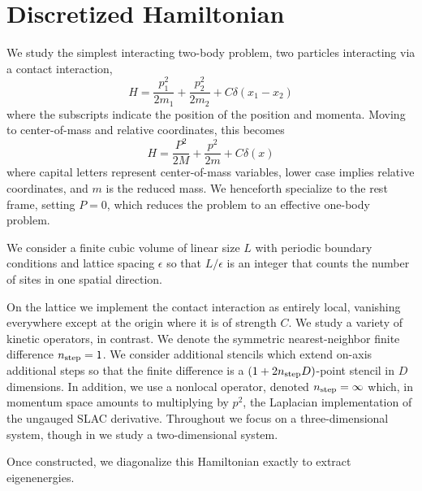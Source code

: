\section{Discretized Hamiltonian}\label{sec:hamiltonian}

We study the simplest interacting two-body problem, two particles interacting via a contact interaction,
\begin{equation}
    H = \frac{p_1^2}{2 m_1} + \frac{p_2^2}{2 m_2} + C \delta(x_1-x_2)
\end{equation}
where the subscripts indicate the position of the position and momenta.  Moving to center-of-mass and relative coordinates, this becomes
\begin{equation}
    H = \frac{P^2}{2 M} + \frac{p^2}{2 m} + C \delta(x)
\end{equation}
where capital letters represent center-of-mass variables, lower case implies relative coordinates, and $m$ is the reduced mass.  We henceforth specialize to the rest frame, setting $P=0$, which reduces the problem to an effective one-body problem.

We consider a finite cubic volume of linear size $L$ with periodic boundary conditions and lattice spacing $\epsilon$ so that $L/\epsilon$ is an integer that counts the number of sites in one spatial direction.

On the lattice we implement the contact interaction as entirely local, vanishing everywhere except at the origin where it is of strength $C$.  We study a variety of kinetic operators, in contrast.  We denote the symmetric nearest-neighbor finite difference $n_\text{step}=1$.  We consider additional stencils which extend on-axis additional steps so that the finite difference is a $(1+2n_\text{step} D)$-point stencil in $D$ dimensions.  In addition, we use a nonlocal operator, denoted $n_\text{step}=\infty$ which, in momentum space amounts to multiplying by $p^2$, the Laplacian implementation of the ungauged SLAC derivative.
Throughout we focus on a three-dimensional system, though in  we study a two-dimensional system.

Once constructed, we diagonalize this Hamiltonian exactly to extract eigenenergies.

